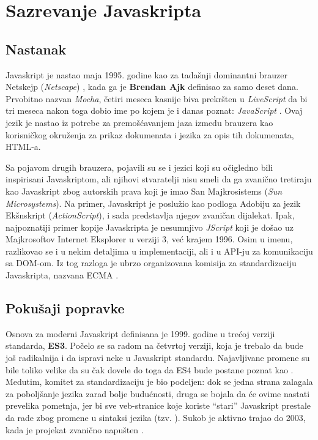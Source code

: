 \section{Sazrevanje Javaskripta}
\label{sec:sazrevanje-javaskripta}

\subsection{Nastanak}

Javaskript je nastao maja 1995. godine kao  \cite{computerworld:a-z-of-js} za tadašnji dominantni brauzer Netskejp (\textsl{Netscape}) \cite{axel-rauschmayer:impatient}, kada ga je \textbf{Brendan Ajk} definisao za samo deset dana.
Prvobitno nazvan \textsl{Mocha}, četiri meseca kasnije biva prekršten u \textsl{LiveScript} da bi tri meseca nakon toga dobio ime po kojem je i danas poznat: \textsl{JavaScript} \cite{a-brief-history-of-js}.
Ovaj jezik je nastao iz potrebe za premošćavanjem jaza izmedu brauzera kao korisničkog okruženja za prikaz dokumenata i jezika za opis tih dokumenata, HTML-a.

Sa pojavom drugih brauzera, pojavili su se i jezici koji su očigledno bili inspirisani Javaskriptom, ali njihovi stvaratelji nisu smeli da ga zvanično tretiraju kao Javaskript zbog autorskih prava koji je imao San Majkrosistems (\textsl{Sun Microsystems}).
Na primer, Javaskript je poslužio kao podloga Adobiju za jezik Ekšnskript (\textsl{ActionScript}), i sada predstavlja njegov zvaničan dijalekat.
Ipak, najpoznatiji primer kopije Javaskripta je nesumnjivo \textsl{JScript} koji je došao uz Majkrosoftov Internet Eksplorer u verziji 3, već krajem 1996.
Osim u imenu, razlikovao se i u nekim detaljima u implementaciji, ali i u API-ju za komunikaciju sa DOM-om.
Iz tog razloga je ubrzo organizovana komisija za standardizaciju Javaskripta, nazvana ECMA \cite{axel-rauschmayer:speaking}.

\subsection{Pokušaji popravke}

Osnova za moderni Javaskript definisana je 1999. godine u trećoj verziji standarda, \textbf{ES3}.
Počelo se sa radom na četvrtoj verziji, koja je trebalo da bude još radikalnija i da ispravi neke  u Javaskript standardu.
Najavljivane promene su bile toliko velike da su čak dovele do toga da ES4 bude postane poznat kao .
Medutim, komitet za standardizaciju je bio podeljen: dok se jedna strana zalagala za poboljšanje jezika zarad bolje budućnosti, druga se bojala da će ovime nastati prevelika pometnja, jer bi sve veb-stranice koje koriste “stari” Javaskript prestale da rade zbog promene u sintaksi jezika (tzv. ).
Sukob je aktivno trajao do 2003, kada je projekat zvanično napušten \cite{incomplete-js-history}.

